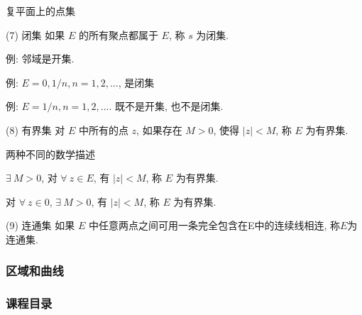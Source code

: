 \documentclass{beamer}
\begin{document}
\begin{frame}{复平面上的点集}
\begin{alertblock}{(7) 闭集}
	如果 $ E $ 的所有聚点都属于 $ E $, 称 $ s $ 为闭集. 
	
	例: 邻域是开集. 
	
	例: $ E=0, 1/n, n=1, 2, \dots  $,  是闭集
	
	例: $ E={1/n}, n=1, 2, \dots  $. 既不是开集, 也不是闭集. 
\end{alertblock}

\begin{alertblock}{(8) 有界集}
	对 $ E $ 中所有的点 $ z $, 如果存在 $ M>0 $, 使得 $ |z|<M $, 称 $ E $ 为有界集. 
	
	两种不同的数学描述
	
	 $ \exists\: M>0 $, 对 $ \forall\: z \in E $, 有 $ |z|<M $, 称 $ E $ 为有界集. 
	
	对 $ \forall\: z\in 0 $,  $ \exists\: M>0  $, 有 $ |z|<M $, 称 $ E $ 为有界集. 
	
\end{alertblock}

\begin{alertblock}{(9) 连通集}
	如果 $ E $ 中任意两点之间可用一条完全包含在E中的连续线相连, 称$E$为连通集. 
	
\end{alertblock}

\end{frame}

\subsubsection{区域和曲线}

\begin{frame}
\frametitle{课程目录}
\tableofcontents[currentsubsection ] %
\end{frame}
\end{document}
